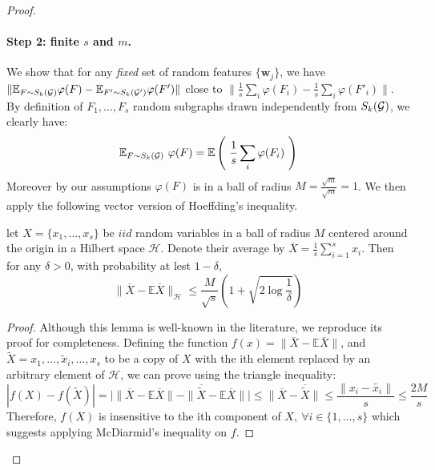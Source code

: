 \begin{proof}
\paragraph{Step 2: finite ${s}$ and $m$.} We show that for any \emph{fixed} set of random features $\{\mathbf{w}_j\}$, we have $\| \mathbb{E}_{F \sim S_k(\mathcal{G})} \varphi(F) - \mathbb{E}_{F' \sim S_k(\mathcal{G}')} \varphi(F')\|$ close to $\| \frac{1}{{s}} \sum_i \varphi(F_i) - \frac{1}{{s}} \sum_i \varphi(F'_i)\|$. 
By definition of $F_1,\ldots, F_{s}$ random subgraphs drawn independently from $S_k(\mathcal{G})$, we clearly have: 
\begin{equation}
\label{eq:subsample}
    \mathbb{E}_{F \sim S_k(\mathcal{G})}~ \varphi(F)= \mathbb{E}\left(~\frac{1}{{s}} \sum_i \varphi(F_i)~\right)
\end{equation} 
Moreover by our assumptions $\varphi(F)$ is in a ball of radius $M=\frac{\sqrt{m}}{\sqrt{m}}=1$. We then apply the following vector version of Hoeffding's inequality.
\begin{lemma}
\label{lemma:vector_hoeffding}
let $X=\{x_1,\ldots,x_{s}\}$ be $iid$ random variables in a ball of radius $M$ centered around the origin in a Hilbert space $\mathcal{H}$. Denote their average by $\overline{X}=\frac{1}{{s}}\sum_{i=1}^{s}x_i$. Then for any $\delta>0$, with probability at lest $1-\delta$, 
\begin{equation}
\label{eq:vector_hoeffding0}
  \| \overline{X}-\mathbb{E}\overline{X}\|_\mathcal{H} \leq \frac{M}{\sqrt{{s}}}\left(1+\sqrt{2\log\frac{1}{\delta}}\right)
\end{equation}
\end{lemma}
\begin{proof}
Although this lemma is well-known in the literature, we reproduce its proof for completeness. Defining the function $f(x)= \| \overline{X}-\mathbb{E}\overline{X}\|$, and $\widetilde{X}={x_1,\ldots,\widetilde{x}_i,\ldots,x_{s}}$ to be a copy of $X$ with the ith element replaced by an arbitrary element of $\mathcal{H}$, we can prove using the triangle inequality:
\begin{equation}
    |f(X)-f(\widetilde{X})|=\Big|\| \overline{X}-\mathbb{E}\overline{X} \|-\|\overline{\widetilde{X}} - \mathbb{E}\overline{X}  \| \Big|\leq \| \overline{X} - \overline{\widetilde{X}}\|\leq
    \frac{\|x_i - \widetilde{x_i} \|}{{s}}\leq
    \frac{2M}{{s}}
\end{equation}
Therefore, $f(X)$ is insensitive to the ith component of $X,~ \forall i \in \{1,\ldots,{s}\}$ which suggests applying McDiarmid's inequality on $f$.


\end{proof}
\end{proof}
